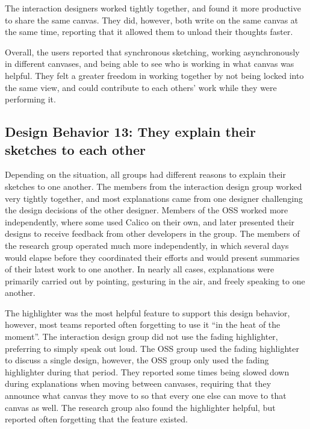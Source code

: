 The interaction designers worked tightly together, and found it more productive to share the same canvas. They did, however, both write on the same canvas at the same time, reporting that it allowed them to unload their thoughts faster.

Overall, the users reported that synchronous sketching, working asynchronously in different canvases, and being able to see who is working in what canvas was helpful. They felt a greater freedom in working together by not being locked into the same view, and could contribute to each others' work while they were performing it. 

%

\subsection{Design Behavior 13: They explain their sketches to each other}

Depending on the situation, all groups had different reasons to explain their sketches to one another. The members from the interaction design group worked very tightly together, and most explanations came from one designer challenging the design decisions of the other designer. Members of the OSS worked more independently, where some used Calico on their own, and later presented their designs to receive feedback from other developers in the group. The members of the research group operated much more independently, in which several days would elapse before they coordinated their efforts and would present summaries of their latest work to one another. In nearly all cases, explanations were primarily carried out by pointing, gesturing in the air, and freely speaking to one another.

The highlighter was the most helpful feature to support this design behavior, however, most teams reported often forgetting to use it ``in the heat of the moment''. The interaction design group did not use the fading highlighter, preferring to simply speak out loud. The OSS group used the fading highlighter to discuss a single design, however, the OSS group only used the fading highlighter during that period. They reported some times being slowed down during explanations when moving between canvases, requiring that they announce what canvas they move to so that every one else can move to that canvas as well. The research group also found the highlighter helpful, but reported often forgetting that the feature existed.

